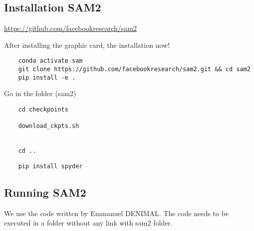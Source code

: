 \documentclass{article}
\begin{document}
\subsection{Installation SAM2}
\url{https://github.com/facebookresearch/sam2}




After installing the graphic card, the installation now! 


\begin{lstlisting}
    conda activate sam
    git clone https://github.com/facebookresearch/sam2.git && cd sam2
    pip install -e .
\end{lstlisting}

Go in the folder (sam2)
\begin{lstlisting}
    cd checkpoints 
    
    download_ckpts.sh
    
    
    cd ..

\end{lstlisting}
\begin{lstlisting}
    pip install spyder
\end{lstlisting}


\subsection{Running SAM2}
We use the code written by Emmanuel DENIMAL. 
The code needs to be executed in a folder without any link with sam2 folder.  



\end{document}
